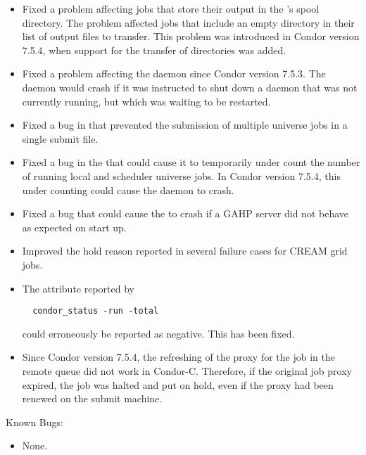 \begin{itemize}
\item Fixed a problem affecting jobs that store their output in the
  's spool directory.  The problem affected jobs that
  include an empty directory in their list of output files to
  transfer.  This problem was introduced in Condor version 7.5.4,
  when support for the transfer of directories was added.

\item Fixed a problem affecting the  daemon since
  Condor version 7.5.3.  
  The  daemon would crash if it was instructed
  to shut down a daemon that was not currently running,
  but which was waiting to be restarted.

\item Fixed a bug in  that prevented the submission of
multiple  universe jobs in a single submit file.

\item Fixed a bug in the  that could cause it to temporarily
under count the number of running local and scheduler universe jobs. 
In Condor version 7.5.4, 
this under counting could cause the daemon to crash.

\item Fixed a bug that could cause the  to crash if
a GAHP server did not behave as expected on start up.

\item Improved the hold reason reported in several failure cases for 
CREAM grid jobs.

\item The  attribute reported by 
\begin{verbatim}
  condor_status -run -total 
\end{verbatim}
could erroneously be reported as negative.  This has been fixed.

\item Since Condor version 7.5.4, the refreshing of the proxy for the job in the
  remote queue did not work in Condor-C.  Therefore, if the original job proxy
  expired, the job was halted and put on hold, even if the proxy had
  been renewed on the submit machine.

\end{itemize}

\noindent Known Bugs:

\begin{itemize}

\item None.

\end{itemize}

